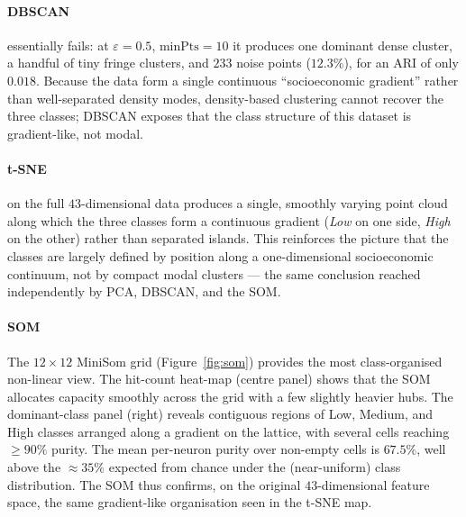 \documentclass{ieeeaccess}
\begin{document}
\paragraph{DBSCAN} essentially fails: at $\varepsilon=0.5$, $\mathrm{minPts}=10$ it produces one dominant dense cluster, a handful of tiny fringe clusters, and $233$ noise points ($12.3\%$), for an ARI of only $0.018$. Because the data form a single continuous ``socioeconomic gradient'' rather than well-separated density modes, density-based clustering cannot recover the three classes; DBSCAN exposes that the class structure of this dataset is gradient-like, not modal.

\paragraph{t-SNE} on the full $43$-dimensional data produces a single, smoothly varying point cloud along which the three classes form a continuous gradient (\emph{Low} on one side, \emph{High} on the other) rather than separated islands. This reinforces the picture that the classes are largely defined by position along a one-dimensional socioeconomic continuum, not by compact modal clusters --- the same conclusion reached independently by PCA, DBSCAN, and the SOM.

\paragraph{SOM} The $12\times 12$ MiniSom grid (Figure~\ref{fig:som}) provides the most class-organised non-linear view. The hit-count heat-map (centre panel) shows that the SOM allocates capacity smoothly across the grid with a few slightly heavier hubs. The dominant-class panel (right) reveals contiguous regions of Low, Medium, and High classes arranged along a gradient on the lattice, with several cells reaching $\geq 90\%$ purity. The mean per-neuron purity over non-empty cells is $67.5\%$, well above the $\approx 35\%$ expected from chance under the (near-uniform) class distribution. The SOM thus confirms, on the original $43$-dimensional feature space, the same gradient-like organisation seen in the t-SNE map.

\end{document}
